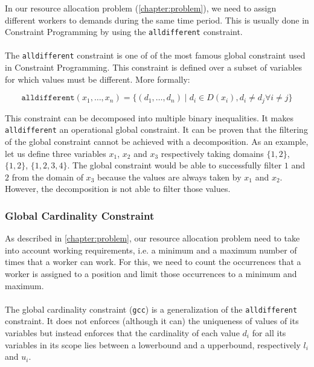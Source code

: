 \documentclass[../../thesis.tex]{subfiles}
\begin{document}
In our resource allocation problem (\ref{chapter:problem}), we need to assign different workers to demands during the same time period. 
This is usually done in Constraint Programming by using the \texttt{alldifferent} constraint.

\paragraph{}

The \texttt{alldifferent} constraint \cite{Rgin1994AFA} is one of of the most famous global constraint used in Constraint 
Programming.
This constraint is defined over a subset of variables for which values must be different. More formally:

\begin{equation*}
  \texttt{alldifferent}(x_1, \dots, x_n) = \{ (d_1, \dots, d_n) \mid d_i \in D(x_i), d_i \neq d_j \forall i \neq j \}
\end{equation*}

This constraint can be decomposed into multiple binary inequalities. It makes \texttt{alldifferent} an operational global constraint.
It can be proven that the filtering of the global constraint cannot be achieved with a decomposition. As 
an example, let us define three variables $x_1$, $x_2$ and $x_3$ respectively taking domains $\{1,2\}$, $\{1,2\}$, $\{1,2,3,4\}$. 
The global constraint would be able to successfully filter $1$ and $2$ from the domain of 
$x_3$ because the values are always taken by $x_1$ and $x_2$. However, the decomposition is not able to filter those values.


\subsubsection{Global Cardinality Constraint}
\label{sota:gcc}

As described in \autoref{chapter:problem}, our resource allocation problem need to take into account working requirements, i.e. a minimum 
and a maximum number of times that a worker can work. For this, we need to count the occurrences that a worker is assigned to a position and 
limit those occurrences to a minimum and maximum. 

\paragraph{}


The global cardinality constraint (\texttt{gcc}) \cite{Regin:1996} is a generalization of the 
\texttt{alldifferent} constraint. It does not enforces (although it can) the uniqueness of values of its variables
but instead enforces that the cardinality of each value $d_i$ for all its variables in its scope lies
between a lowerbound and a upperbound, respectively $l_i$ and $u_i$. 
\end{document}
